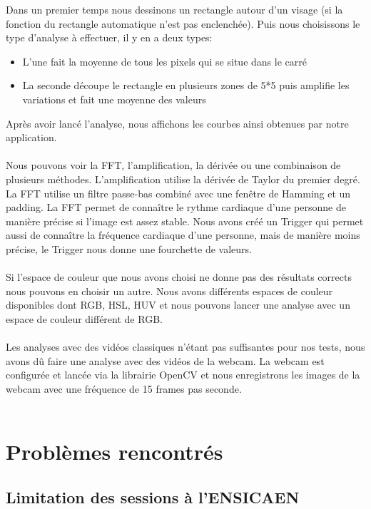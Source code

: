 Dans un premier temps nous dessinons un rectangle autour d'un visage (si la fonction du rectangle automatique n'est pas enclenchée).
Puis nous choisissons le type d'analyse à effectuer, il y en a deux types:
\begin{itemize}
	\item L'une fait la moyenne de tous les pixels qui se situe dans le carré
	\item La seconde découpe le rectangle en plusieurs zones de 5*5 puis amplifie les variations et fait une moyenne des valeurs
\end{itemize}
Après avoir lancé l'analyse, nous affichons les courbes ainsi obtenues par notre application.\\\\

Nous pouvons voir la FFT, l'amplification, la dérivée ou une combinaison de plusieurs méthodes.
L'amplification utilise la dérivée de Taylor du premier degré.
La FFT utilise un filtre passe-bas combiné avec une fenêtre de Hamming et un padding.
La FFT permet de connaître le rythme cardiaque d'une personne de manière précise si l'image est assez stable.
Nous avons créé un Trigger qui permet aussi de connaître la fréquence cardiaque d'une personne, mais de manière moins précise, le Trigger nous donne une fourchette de valeurs.\\\\

Si l'espace de couleur que nous avons choisi ne donne pas des résultats corrects nous pouvons en choisir un autre.
Nous avons différents espaces de couleur disponibles dont RGB, HSL, HUV et nous pouvons lancer une analyse avec un espace de couleur différent de RGB.\\\\

Les analyses avec des vidéos classiques n'étant pas suffisantes pour nos tests, nous avons dû faire une analyse avec des vidéos de la webcam.
La webcam est configurée et lancée via la librairie OpenCV et nous enregistrons les images de la webcam avec une fréquence de 15 frames pas seconde.\\\\

\section{Problèmes rencontrés}

\subsection{Limitation des sessions à l'ENSICAEN}

